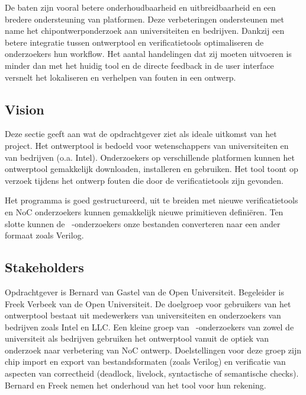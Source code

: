 De baten zijn vooral betere onderhoudbaarheid en uitbreidbaarheid en een bredere ondersteuning van platformen.
Deze verbeteringen ondersteunen met name het chipontwerponderzoek aan universiteiten en bedrijven. Dankzij een betere integratie
tussen ontwerptool en verificatietools optimaliseren de onderzoekers hun workflow. Het aantal handelingen
dat zij moeten uitvoeren is minder dan met het huidig tool en de directe feedback in de user interface
versnelt het lokaliseren en verhelpen van fouten in een ontwerp.

\subsection{Vision}\label{sec: vision}

Deze sectie geeft aan wat de opdrachtgever ziet als ideale uitkomst van het project. Het ontwerptool is
bedoeld voor wetenschappers van universiteiten en van bedrijven (o.a. Intel). Onderzoekers op verschillende
platformen kunnen het ontwerptool gemakkelijk downloaden, installeren en gebruiken. Het tool toont op verzoek
tijdens het ontwerp fouten die door de verificatietools zijn gevonden.

Het programma is goed gestructureerd, uit te breiden met nieuwe verificatietools en NoC onderzoekers
kunnen gemakkelijk nieuwe primitieven defini\"eren. Ten slotte kunnen de \xmas\ -onderzoekers onze bestanden
converteren naar een ander formaat zoals Verilog.

\subsection{Stakeholders}

Opdrachtgever is Bernard van Gastel van de Open Universiteit. Begeleider is Freek Verbeek van de Open Universiteit.
De doelgroep voor gebruikers van het ontwerptool bestaat uit medewerkers van universiteiten en onderzoekers van bedrijven zoals
Intel en LLC. Een kleine groep van \xmas\ -onderzoekers van zowel de universiteit als bedrijven gebruiken het ontwerptool
vanuit de optiek van onderzoek naar verbetering van NoC ontwerp. Doelstellingen voor deze groep zijn chip import
en export van bestandsformaten (zoals Verilog) en verificatie van aspecten van correctheid (deadlock, livelock,
syntactische of semantische checks). Bernard en Freek nemen het onderhoud van het tool voor hun rekening.


